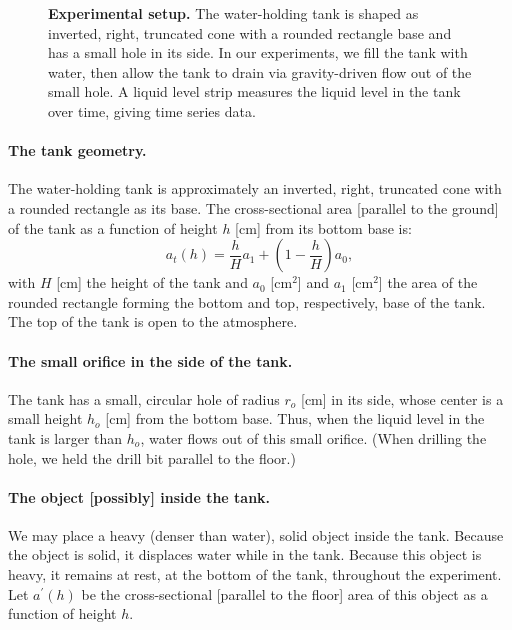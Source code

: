 \documentclass[openacc]{rsproca_new}%
\begin{document}
\begin{figure}[h!]
\begin{center}
	\caption{\textbf{Experimental setup.} 
	The water-holding tank is shaped as inverted, right, truncated cone with a rounded rectangle base and has a small hole in its side. In our experiments, we fill the tank with water, then allow the tank to drain via gravity-driven flow out of the small hole. A liquid level strip measures the liquid level in the tank over time, giving time series data.
	}
	\label{fig:photo_of_tank}
\end{center}
\end{figure}

\paragraph{The tank geometry.} The water-holding tank is approximately an inverted, right, truncated cone with a rounded rectangle as its base. The cross-sectional area [parallel to the ground] of the tank as a function of height $h$ [cm] from its bottom base is:
\begin{equation}
	a_t(h) = \frac{h}{H}a_1 + \left(1-\frac{h}{H}\right) a_0,
\end{equation}
with $H$ [cm] the height of the tank and $a_0$ [cm$^2$] and $a_1$ [cm$^2$] the area of the rounded rectangle forming the bottom and top, respectively, base of the tank.
The top of the tank is open to the atmosphere. 

\paragraph{The small orifice in the side of the tank.} The tank has a small, circular hole of radius $r_o$ [cm] in its side, whose center is a small height $h_o$ [cm] from the bottom base.
Thus, when the liquid level in the tank is larger than $h_o$, water flows out of this small orifice.
(When drilling the hole, we held the drill bit parallel to the floor.) 

\paragraph{The object [possibly] inside the tank.} We may place a heavy (denser than water), solid object inside the tank. Because the object is solid, it displaces water while in the tank. Because this object is heavy, it remains at rest, at the bottom of the tank, throughout the experiment. Let $a^\prime(h)$ be the cross-sectional [parallel to the floor] area of this object as a function of height $h$.
\end{document}
